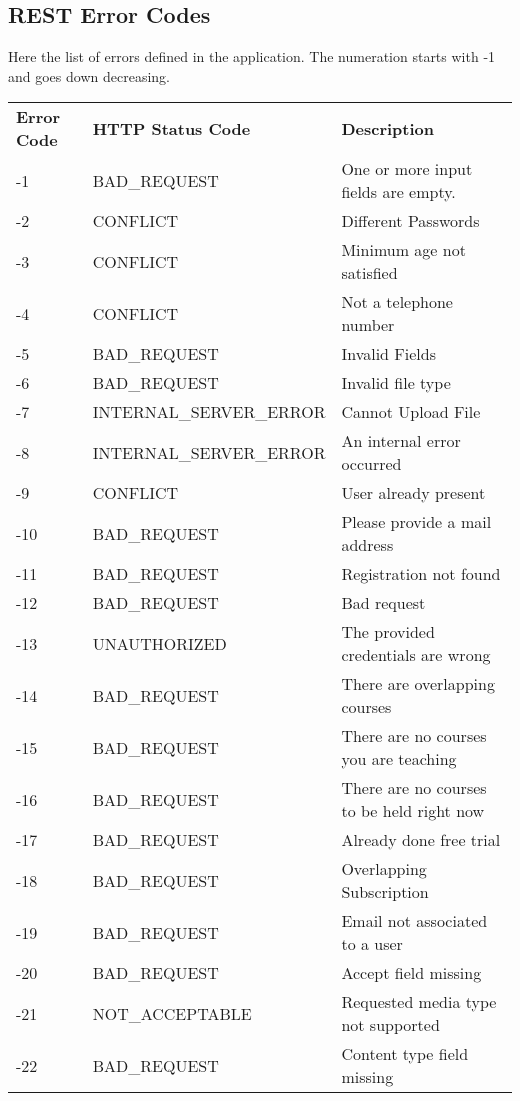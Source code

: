 \subsection{REST Error Codes}
Here the list of errors defined in the application. The numeration starts with -1 and goes down decreasing.

\begin{longtable}{|p{}|p{} |p{}|} 
	\hline
	\textbf{Error Code} & \textbf{HTTP Status Code} & \textbf{Description} \\	
	-1 &  BAD\_REQUEST & One or more input fields are empty. \\
	-2 &  CONFLICT & Different Passwords \\
	-3 &  CONFLICT & Minimum age not satisfied \\
	-4 &  CONFLICT & Not a telephone number \\ 
	-5 &  BAD\_REQUEST & Invalid Fields \\
	-6 &  BAD\_REQUEST & Invalid file type \\ 
	-7 &  INTERNAL\_SERVER\_ERROR & Cannot Upload File \\ 
	-8 &  INTERNAL\_SERVER\_ERROR & An internal error occurred \\ 
	-9 &  CONFLICT & User already present \\
	-10 &  BAD\_REQUEST & Please provide a mail address \\ 
	-11 &  BAD\_REQUEST & Registration not found \\ 
	-12 &  BAD\_REQUEST & Bad request \\
	-13 &  UNAUTHORIZED & The provided credentials are wrong \\ 
	-14 &  BAD\_REQUEST & There are overlapping courses \\ 
	-15 &  BAD\_REQUEST & There are no courses you are teaching \\ 
	-16 &  BAD\_REQUEST & There are no courses to be held right now \\ 
	-17 &  BAD\_REQUEST & Already done free trial \\
	-18 &  BAD\_REQUEST & Overlapping Subscription \\ 
	-19 &  BAD\_REQUEST & Email not associated to a user \\
	-20 &  BAD\_REQUEST & Accept field missing \\
	-21 &  NOT\_ACCEPTABLE & Requested media type not supported \\ 
	-22 &  BAD\_REQUEST & Content type field missing \\

\end{longtable}
